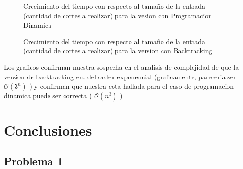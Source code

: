 \documentclass[12pt, a4paper,english,spanish]{article}
\begin{document}
\begin{figure}[here]
\caption{Crecimiento del tiempo con respecto al tama\~no de la entrada (cantidad de cortes a realizar) para la vesion con Programacion Dinamica}
\label{Variacion de la cantidad de operaciones variando la cantidad de dias.}
\end{figure}

\begin{figure}[here]
\caption{Crecimiento del tiempo con respecto al tama\~no de la entrada (cantidad de cortes a realizar) para la version con Backtracking}
\label{Variacion de la cantidad de operaciones variando la cantidad de dias.}
\end{figure}

Los graficos confirman nuestra sospecha en el analisis de complejidad de que la version de backtracking era del orden exponencial (graficamente, pareceria ser $\mathcal{O}(3^{n})$ ) y confirman que nuestra cota hallada para el caso de programacion dinamica puede ser correcta ( $\mathcal{O}(n^{3})$ )

\newpage

\section{Conclusiones}

\subsection*{Problema 1}
\end{document}
